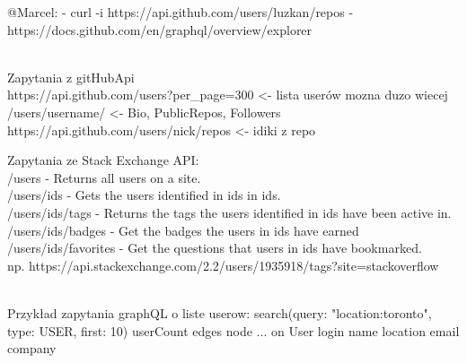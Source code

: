 \documentclass[graybox]{svmult}
\begin{document}
@Marcel:
 - curl -i https://api.github.com/users/luzkan/repos
 - https://docs.github.com/en/graphql/overview/explorer
 
 \\Zapytania z gitHubApi
 \\https://api.github.com/users?per\_page=300 <- lista userów mozna duzo wiecej
 \\ /users/{username}/ <- Bio, PublicRepos, Followers
 \\ https://api.github.com/users/{nick}/repos <- idiki z repo
 
Zapytania ze Stack Exchange API:\\
/users - Returns all users on a site.\\
/users/{ids} - Gets the users identified in ids in {ids}.\\
/users/{ids}/tags - Returns the tags the users identified in {ids} have been active in.\\
/users/{ids}/badges - Get the badges the users in {ids} have earned\\
/users/{ids}/favorites - Get the questions that users in {ids} have bookmarked.\\

np. https://api.stackexchange.com/2.2/users/1935918/tags?site=stackoverflow

\\
Przykład zapytania graphQL o liste userow:
{
  search(query: "location:toronto", type: USER, first: 10) {
    userCount
    edges {
      node {
        ... on User {
          login
          name
          location
          email
          company
        }
      }
    }
  }
}





%
\end{document}
